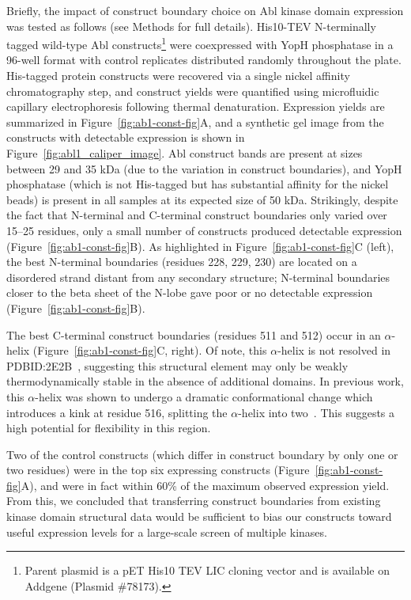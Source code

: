\documentclass[phd,tocprelim]{cornell}
\begin{document}
Briefly, the impact of construct boundary choice on Abl kinase domain expression was tested as follows (see Methods for full details). 
His10-TEV N-terminally tagged wild-type Abl constructs\footnote{Parent plasmid is a pET His10 TEV LIC cloning vector and is available on Addgene (Plasmid \#78173).} were coexpressed with YopH phosphatase in a 96-well format with control replicates distributed randomly throughout the plate.
His-tagged protein constructs were recovered via a single nickel affinity chromatography step, and construct yields were quantified using microfluidic capillary electrophoresis following thermal denaturation. 
Expression yields are summarized in Figure~\ref{fig:ab1-const-fig}A, and a synthetic gel image from the constructs with detectable expression is shown in Figure~\ref{fig:abl1_caliper_image}. 
Abl construct bands are present at sizes between 29 and 35 kDa (due to the variation in construct boundaries), and YopH phosphatase (which is not His-tagged but has substantial affinity for the nickel beads) is present in all samples at its expected size of 50 kDa. 
Strikingly, despite the fact that N-terminal and C-terminal construct boundaries only varied over 15--25 residues, only a small number of constructs produced detectable expression (Figure~\ref{fig:ab1-const-fig}B). 
As highlighted in Figure~\ref{fig:ab1-const-fig}C (left), the best N-terminal boundaries (residues 228, 229, 230) are located on a disordered strand distant from any secondary structure; N-terminal boundaries closer to the beta sheet of the N-lobe gave poor or no detectable expression (Figure~\ref{fig:ab1-const-fig}B). 

The best C-terminal construct boundaries (residues 511 and 512) occur in an $\alpha$-helix (Figure~\ref{fig:ab1-const-fig}C, right). 
Of note, this $\alpha$-helix is not resolved in PDBID:2E2B~\citep{Horio:2007wo}, suggesting this structural element may only be weakly thermodynamically stable in the absence of additional domains. In previous work, this $\alpha$-helix was shown to undergo a dramatic conformational change which introduces a kink at residue 516, splitting the $\alpha$-helix into two~\citep{Nagar:2003tu}. This suggests a high potential for flexibility in this region. 

Two of the control constructs (which differ in construct boundary by only one or two residues) were in the top six expressing constructs (Figure~\ref{fig:ab1-const-fig}A), and were in fact within 60\% of the maximum observed expression yield.
From this, we concluded that transferring construct boundaries from existing kinase domain structural data would be sufficient to bias our constructs toward useful expression levels for a large-scale screen of multiple kinases. 
\end{document}
